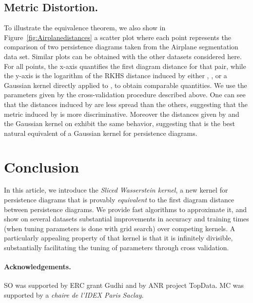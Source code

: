 \documentclass[11pt]{article}
\begin{document}
\subsection{Metric Distortion.} 

To illustrate the equivalence theorem, we also show in Figure~\ref{fig:Airplanedistances} 
a scatter plot where each point represents the comparison of two persistence diagrams taken from the Airplane segmentation data set. 
Similar plots can be obtained with the other datasets considered here.
For all points, the x-axis quantifies the first diagram distance  for that pair,
while the y-axis is the logarithm of the RKHS distance induced by either , ,  
or a Gaussian kernel directly applied to , to obtain comparable quantities. 
We use the parameters given by the cross-validation procedure described above.
One can see that the distances induced by  are less spread than the others,
suggesting that the metric induced by  is more discriminative.
Moreover the distances given by  and the Gaussian kernel on  exhibit the same behavior, 
suggesting that  is the best natural equivalent of a Gaussian kernel for persistence diagrams. 



\section{Conclusion}

In this article, we introduce the {\em Sliced Wasserstein kernel},
a new kernel for persistence diagrams that is provably {\em equivalent} to the first
diagram distance between persistence diagrams. We provide fast algorithms to approximate it,
and show on several datasets substantial improvements in accuracy and training times 
(when tuning parameters is done with grid search) over competing kernels. 
A particularly appealing property of that kernel is that it is infinitely divisible, 
substantially facilitating the tuning of parameters through cross validation.

\paragraph{Acknowledgements.}
SO was supported by ERC grant Gudhi and by ANR project TopData. 
MC was supported by a {\em chaire de l'IDEX Paris Saclay}.



\end{document}
